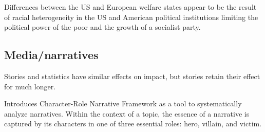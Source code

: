 \documentclass{article}
\newcommand{\citem}[1]{\medskip \noindent \textbf{\cite*{#1}}}
\begin{document}
\citem{alesina2001doesn}

Differences between the US and European welfare states appear to be the result of racial heterogeneity in the US and American political institutions limiting the political power of the poor and the growth of a socialist party.

\subsection{Media/narratives}

\citem{graeber2024stories}

Stories and statistics have similar effects on impact, but stories retain their effect for much longer.

\citem{gehring2025virality}

Introduces Character-Role Narrative Framework as a tool to systematically analyze narratives. Within the context of a topic, the essence of a narrative is captured by its characters in one of three essential roles: hero, villain, and victim.



\newpage

\end{document}
